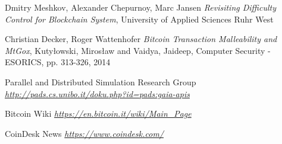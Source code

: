\begin{thebibliography}{99}
 Dmitry Meshkov, Alexander Chepurnoy, Marc Jansen
{\em Revisiting Difficulty Control for Blockchain System},
University of Applied Sciences Ruhr West

 Christian Decker, Roger Wattenhofer
{\em Bitcoin Transaction Malleability and MtGox},
Kuty{\l}owski, Miros{\l}aw and Vaidya, Jaideep, Computer Security - ESORICS, pp. 313-326, 2014

 Parallel and Distributed Simulation Research Group
{\em \url{http://pads.cs.unibo.it/doku.php?id=pads:gaia-apis}}

 Bitcoin Wiki
{\em \url{https://en.bitcoin.it/wiki/Main_Page}}

 CoinDesk News
{\em \url{https://www.coindesk.com/}}

\end{thebibliography}
